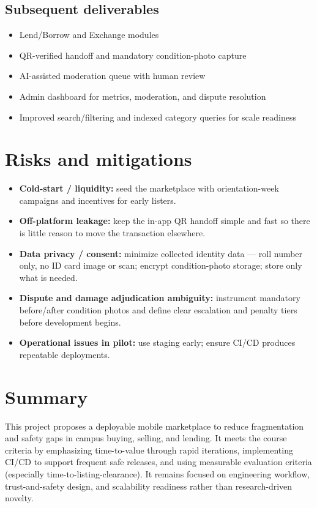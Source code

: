 \documentclass[11pt,a4paper]{article}
\begin{document}
\subsection{Subsequent deliverables}
\begin{itemize}[leftmargin=0.7cm]
    \item Lend/Borrow and Exchange modules
    \item QR-verified handoff and mandatory condition-photo capture
    \item AI-assisted moderation queue with human review
    \item Admin dashboard for metrics, moderation, and dispute resolution
    \item Improved search/filtering and indexed category queries for scale readiness
\end{itemize}

\section{Risks and mitigations}
\begin{itemize}[leftmargin=0.7cm]
    \item \textbf{Cold-start / liquidity:} seed the marketplace with orientation-week campaigns and incentives for early listers.
    \item \textbf{Off-platform leakage:} keep the in-app QR handoff simple and fast so there is little reason to move the transaction elsewhere.
    \item \textbf{Data privacy / consent:} minimize collected identity data — roll number only, no ID card image or scan; encrypt condition-photo storage; store only what is needed.
    \item \textbf{Dispute and damage adjudication ambiguity:} instrument mandatory before/after condition photos and define clear escalation and penalty tiers before development begins.
    \item \textbf{Operational issues in pilot:} use staging early; ensure CI/CD produces repeatable deployments.
\end{itemize}

\section{Summary}
This project proposes a deployable mobile marketplace to reduce
fragmentation and safety gaps in campus buying, selling, and lending. It
meets the course criteria by emphasizing time-to-value through rapid
iterations, implementing CI/CD to support frequent safe releases, and
using measurable evaluation criteria (especially time-to-listing-clearance).
It remains focused on engineering workflow, trust-and-safety design, and
scalability readiness rather than research-driven novelty.
\end{document}
